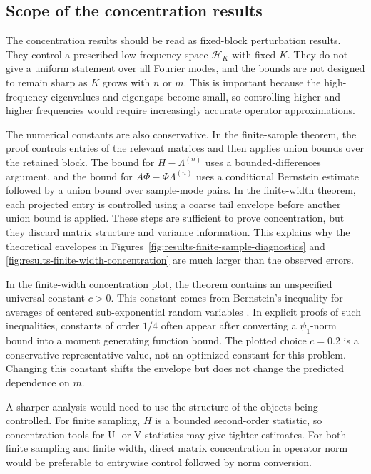 \subsection{Scope of the concentration results}
\label{subsec:discussion-limitations-concentration}

The concentration results should be read as fixed-block perturbation results.
They control a prescribed low-frequency space \(\mathcal H_K\) with fixed \(K\).
They do not give a uniform statement over all Fourier modes, and the bounds are
not designed to remain sharp as \(K\) grows with \(n\) or \(m\). This is important
because the high-frequency eigenvalues and eigengaps become small, so controlling
higher and higher frequencies would require increasingly accurate operator
approximations.

The numerical constants are also conservative. In the finite-sample theorem, the
proof controls entries of the relevant matrices and then applies union bounds
over the retained block. The bound for \(H-\Lambda^{(n)}\) uses a
bounded-differences argument, and the bound for
\(A\Phi-\Phi\Lambda^{(n)}\) uses a conditional Bernstein estimate followed by a
union bound over sample-mode pairs. In the finite-width theorem, each projected
entry is controlled using a coarse tail envelope before another union bound is
applied. These steps are sufficient to prove concentration, but they discard
matrix structure and variance information. This explains why the theoretical
envelopes in Figures~\ref{fig:results-finite-sample-diagnostics} and
\ref{fig:results-finite-width-concentration} are much larger than the observed
errors.

In the finite-width concentration plot, the theorem contains an unspecified
universal constant \(c>0\). This constant comes from Bernstein's inequality for
averages of centered sub-exponential random variables
\citep{Vershynin_2018a}. In explicit proofs of such inequalities, constants of
order \(1/4\) often appear after converting a \(\psi_1\)-norm bound into a
moment generating function bound. The plotted choice \(c=0.2\) is a conservative
representative value, not an optimized constant for this problem. Changing this
constant shifts the envelope but does not change the predicted dependence on
\(m\).

A sharper analysis would need to use the structure of the objects being
controlled. For finite sampling, \(H\) is a bounded second-order statistic, so
concentration tools for U- or V-statistics may give tighter estimates. For both
finite sampling and finite width, direct matrix concentration in operator norm
would be preferable to entrywise control followed by norm conversion.

